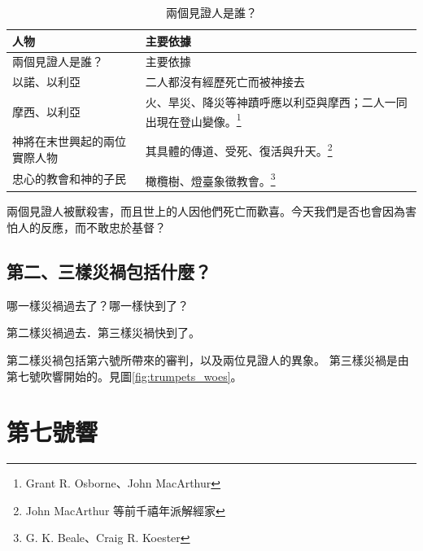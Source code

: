 {
\small
\renewcommand{\arraystretch}{1}

\begin{longtable}{
    @{}
    p{} |
    p{}
    @{}
}
\caption{兩個見證人是誰？}
\label{tab:two-witnesses-zh} \\
\hline 
人物 & 主要依據  \\
\hline
\endfirsthead

兩個見證人是誰？ & 主要依據 \\

\endhead
以諾、以利亞
& 二人都沒有經歷死亡而被神接去 \\

摩西、以利亞
& 火、旱災、降災等神蹟呼應以利亞與摩西；二人一同出現在登山變像。\footnote{Grant R. Osborne、John MacArthur} \\

神將在末世興起的兩位實際人物
& 其具體的傳道、受死、復活與升天。\footnote{John MacArthur 等前千禧年派解經家} \\

忠心的教會和神的子民
& 橄欖樹、燈臺象徵教會。\footnote{G. K. Beale、Craig R. Koester} \\
\hline
\end{longtable}
}

\begin{ReaderQuestion}
兩個見證人被獸殺害，而且世上的人因他們死亡而歡喜。今天我們是否也會因為害怕人的反應，而不敢忠於基督？
\end{ReaderQuestion}

\subsection{第二、三樣災禍包括什麼？}

\begin{ScriptureBox2}{哪一樣災禍過去了？哪一樣快到了？}
\item[11:14] 第二樣災禍過去．第三樣災禍快到了。
\end{ScriptureBox2}

第二樣災禍包括第六號所帶來的審判，以及兩位見證人的異象。
第三樣災禍是由第七號吹響開始的。見圖\ref{fig:trumpets_woes}。

\section{第七號響}


